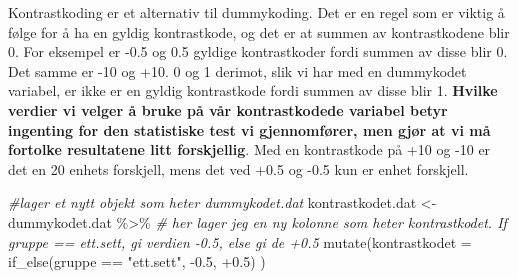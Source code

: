 \documentclass[
]{book}
\newenvironment{Shaded}{\begin{snugshade}}{\end{snugshade}}
\newcommand{\AttributeTok}[1]{\textcolor[rgb]{0.77,0.63,0.00}{#1}}
\newcommand{\CommentTok}[1]{\textcolor[rgb]{0.56,0.35,0.01}{\textit{#1}}}
\newcommand{\FloatTok}[1]{\textcolor[rgb]{0.00,0.00,0.81}{#1}}
\newcommand{\FunctionTok}[1]{\textcolor[rgb]{0.00,0.00,0.00}{#1}}
\newcommand{\NormalTok}[1]{#1}
\newcommand{\OtherTok}[1]{\textcolor[rgb]{0.56,0.35,0.01}{#1}}
\newcommand{\SpecialCharTok}[1]{\textcolor[rgb]{0.00,0.00,0.00}{#1}}
\newcommand{\StringTok}[1]{\textcolor[rgb]{0.31,0.60,0.02}{#1}}
\begin{document}
Kontrastkoding er et alternativ til dummykoding. Det er en regel som er viktig å følge for å ha en gyldig kontrastkode, og det er at summen av kontrastkodene blir 0. For eksempel er -0.5 og 0.5 gyldige kontrastkoder fordi summen av disse blir 0. Det samme er -10 og +10. 0 og 1 derimot, slik vi har med en dummykodet variabel, er ikke er en gyldig kontrastkode fordi summen av disse blir 1. \textbf{Hvilke verdier vi velger å bruke på vår kontrastkodede variabel betyr ingenting for den statistiske test vi gjennomfører, men gjør at vi må fortolke resultatene litt forskjellig}. Med en kontrastkode på +10 og -10 er det en 20 enhets forskjell, mens det ved +0.5 og -0.5 kun er enhet forskjell.

\begin{Shaded}
\begin{Highlighting}[]
\CommentTok{\#lager et nytt objekt som heter dummykodet.dat}
\NormalTok{kontrastkodet.dat }\OtherTok{\textless{}{-}}\NormalTok{ dummykodet.dat }\SpecialCharTok{\%\textgreater{}\%}
  \CommentTok{\# her lager jeg en ny kolonne som heter kontrastkodet. If gruppe == \textquotesingle{}ett.sett\textquotesingle{}, gi verdien {-}0.5, else gi de +0.5}
  \FunctionTok{mutate}\NormalTok{(}\AttributeTok{kontrastkodet =} \FunctionTok{if\_else}\NormalTok{(gruppe }\SpecialCharTok{==} \StringTok{"ett.sett"}\NormalTok{, }\SpecialCharTok{{-}}\FloatTok{0.5}\NormalTok{, }\SpecialCharTok{+}\FloatTok{0.5}\NormalTok{)}
\NormalTok{         )}
\end{Highlighting}
\end{Shaded}
\end{document}

